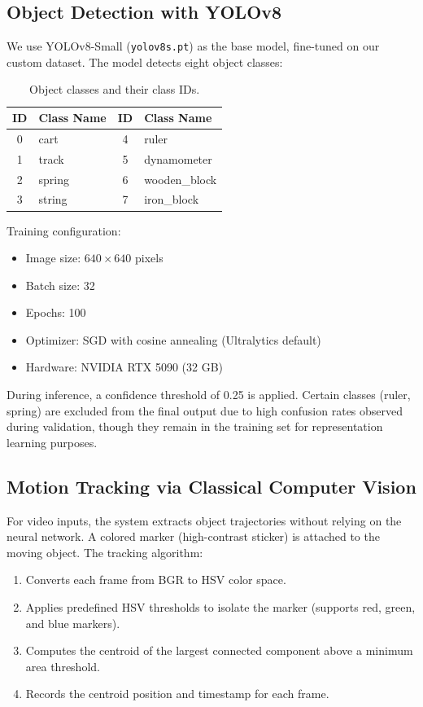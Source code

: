 \documentclass[12pt]{article}
\begin{document}
\subsection{Object Detection with YOLOv8}

We use YOLOv8-Small (\texttt{yolov8s.pt}) as the base model, fine-tuned on our custom dataset. The model detects eight object classes:

\begin{table}[H]
  \centering
  \caption{Object classes and their class IDs.}
  \label{tab:classes}
  \begin{tabular}{cl|cl}
    \toprule
    ID & Class Name & ID & Class Name \\
    \midrule
    0 & cart & 4 & ruler \\
    1 & track & 5 & dynamometer \\
    2 & spring & 6 & wooden\_block \\
    3 & string & 7 & iron\_block \\
    \bottomrule
  \end{tabular}
\end{table}

Training configuration:
\begin{itemize}[noitemsep]
  \item Image size: $640 \times 640$ pixels
  \item Batch size: 32
  \item Epochs: 100
  \item Optimizer: SGD with cosine annealing (Ultralytics default)
  \item Hardware: NVIDIA RTX 5090 (32 GB)
\end{itemize}

During inference, a confidence threshold of 0.25 is applied. Certain classes (ruler, spring) are excluded from the final output due to high confusion rates observed during validation, though they remain in the training set for representation learning purposes.

\subsection{Motion Tracking via Classical Computer Vision}

For video inputs, the system extracts object trajectories without relying on the neural network. A colored marker (high-contrast sticker) is attached to the moving object. The tracking algorithm:

\begin{enumerate}[noitemsep]
  \item Converts each frame from BGR to HSV color space.
  \item Applies predefined HSV thresholds to isolate the marker (supports red, green, and blue markers).
  \item Computes the centroid of the largest connected component above a minimum area threshold.
  \item Records the centroid position and timestamp for each frame.
\end{enumerate}
\end{document}
